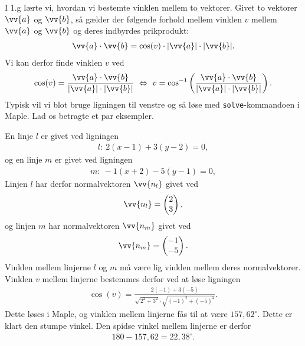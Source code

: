 I 1.g lærte vi, hvordan vi bestemte vinklen mellem to vektorer. Givet to vektorer $\vv{a}$ og $\vv{b}$, så gælder der følgende forhold mellem vinklen $v$ mellem $\vv{a}$ og $\vv{b}$ og deres indbyrdes prikprodukt:
\begin{align*}
	\vv{a}\cdot \vv{b} = \cos(v)\cdot |\vv{a}|\cdot |\vv{b}|.
\end{align*}
Vi kan derfor finde vinklen $v$ ved 
\begin{align*}
	\cos(v) = \frac{\vv{a}\cdot \vv{b}}{|\vv{a}|\cdot |\vv{b}|} \ \Leftrightarrow \ v
	= \cos^{-1}\left(\frac{\vv{a}\cdot \vv{b}}{|\vv{a}|\cdot |\vv{b}|}\right).
\end{align*}
Typisk vil vi blot bruge ligningen til venstre og så løse med \texttt{solve}-kommandoen i Maple. 
Lad os betragte et par eksempler.
\begin{exa}
	En linje $l$ er givet ved ligningen
	\begin{align*}
		l: \ 2(x-1) + 3(y-2) = 0,
	\end{align*}
	og en linje $m$ er givet ved ligningen
	\begin{align*}
		m: \ -1(x+2) -5(y-1) = 0,
	\end{align*}
	Linjen $l$ har derfor normalvektoren $\vv{n_l}$ givet ved
	\begin{align*}
		\vv{n_l} = \begin{pmatrix}
			2 \\ 3	
		\end{pmatrix},
	\end{align*}
	og linjen $m$ har normalvektoren $\vv{n_m}$ givet ved
	\begin{align*}
		\vv{n_m} = \begin{pmatrix}
			-1\\-5
		\end{pmatrix}.
	\end{align*}
	Vinklen mellem linjerne $l$ og $m$ må være lig vinklen mellem deres normalvektorer. 
	Vinklen $v$ mellem linjerne bestemmes derfor ved at løse ligningen
	\begin{align*}
		\cos(v) = \frac{2(-1)+3(-5)}{\sqrt{2^2+3^2}\cdot\sqrt{(-1)^2+(-5)^2}}. 
	\end{align*}
	Dette løses i Maple, og vinklen mellem linjerne fås til at være $157,62^{\circ}$. Dette er 
	klart den stumpe vinkel. Den spidse vinkel mellem linjerne er derfor 
	\begin{align*}
		180-157,62 = 22,38^{\circ}.
	\end{align*}
\end{exa}
